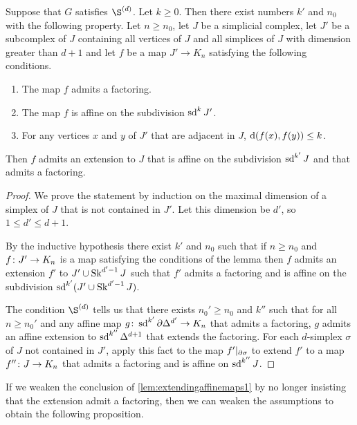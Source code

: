 \documentclass[a4paper]{article}
\begin{document}
\begin{lemma}\label{lem:extendingaffinemaps1}
  Suppose that $G$ satisfies $\Sd{d}$. Let $k \geq 0$. Then there exist numbers
  $k'$ and $n_0$ with the following property. Let $n \geq n_0$, let $J$ be a
  simplicial complex, let $J'$ be a subcomplex of $J$ containing all vertices
  of $J$ and all simplices of $J$ with dimension greater than $d+1$ and let $f$
  be a map $J' \to K_n$ satisfying the following conditions.
  \begin{enumerate}
    \item The map $f$ admits a factoring.
    \item The map $f$ is affine on the subdivision $\operatorname{sd}^k J'$.
    \item For any vertices $x$ and $y$ of $J'$ that are adjacent in $J$,
      $\operatorname{d}(f(x), f(y)) \leq k$.
  \end{enumerate}
  Then $f$ admits an extension to $J$ that is affine on the subdivision
  $\operatorname{sd}^{k'} J$ and that admits a factoring.
\end{lemma}

\begin{proof}
  We prove the statement by induction on the maximal dimension of a simplex of
  $J$ that is not contained in $J'$. Let this dimension be $d'$, so $1 \leq d'
  \leq d+1$.

  By the inductive hypothesis there exist $k'$ and $n_0$ such that if $n \geq
  n_0$ and $f\colon J' \to K_n$ is a map satisfying the conditions of the lemma
  then $f$ admits an extension $f'$ to $J' \cup \operatorname{Sk}^{d'-1} J$ such that $f'$
  admits a factoring and is affine on the subdivision $\operatorname{sd}^{k'} (J' \cup
  \operatorname{Sk}^{d'-1} J)$.

  The condition $\Sd{d}$ tells us that there exists $n_0' \geq n_0$ and $k''$
  such that for all $n \geq n_0'$ and any affine map $g \colon
  \operatorname{sd}^{k'}\partial\Delta^{d'}\to K_n$ that admits a factoring, $g$ admits an
  affine extension to $\operatorname{sd}^{k''}\Delta^{d+1}$ that extends the factoring.
  For each $d$-simplex $\sigma$ of $J$ not contained in $J'$, apply this fact
  to the map $f'\vert_{\partial\sigma}$ to extend $f'$ to a map $f''\colon
  J\to K_n$ that admits a factoring and is affine on $\operatorname{sd}^{k''} J$.
\end{proof}

If we weaken the conclusion of \cref{lem:extendingaffinemaps1} by no
longer insisting that the extension admit a factoring, then we can weaken the
assumptions to obtain the following proposition.
\end{document}
